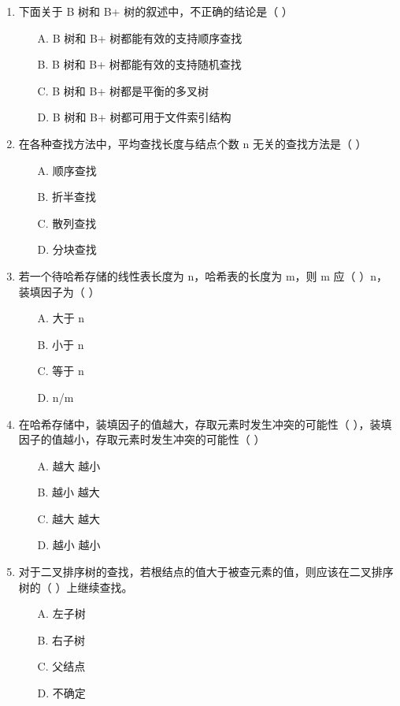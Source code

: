 \documentclass[12pt, a4paper]{article}
\begin{document}
\begin{enumerate}[label=\arabic*.]
	\item 下面关于 B 树和 B+ 树的叙述中，不正确的结论是（ ）
	      \begin{enumerate}
		      \item[A.] B 树和 B+ 树都能有效的支持顺序查找
		      \item[B.] B 树和 B+ 树都能有效的支持随机查找
		      \item[C.] B 树和 B+ 树都是平衡的多叉树
		      \item[D.] B 树和 B+ 树都可用于文件索引结构
	      \end{enumerate}

	\item 在各种查找方法中，平均查找长度与结点个数 n 无关的查找方法是（ ）
	      \begin{enumerate}
		      \item[A.] 顺序查找
		      \item[B.] 折半查找
		      \item[C.] 散列查找
		      \item[D.] 分块查找
	      \end{enumerate}

	\item 若一个待哈希存储的线性表长度为 n，哈希表的长度为 m，则 m 应（ ）n，装填因子为（ ）
	      \begin{enumerate}
		      \item[A.] 大于 n
		      \item[B.] 小于 n
		      \item[C.] 等于 n
		      \item[D.] n/m
	      \end{enumerate}

	\item 在哈希存储中，装填因子的值越大，存取元素时发生冲突的可能性（ ），装填因子的值越小，存取元素时发生冲突的可能性（ ）
	      \begin{enumerate}
		      \item[A.] 越大 越小
		      \item[B.] 越小 越大
		      \item[C.] 越大 越大
		      \item[D.] 越小 越小
	      \end{enumerate}

	\item 对于二叉排序树的查找，若根结点的值大于被查元素的值，则应该在二叉排序树的（ ）上继续查找。
	      \begin{enumerate}
		      \item[A.] 左子树
		      \item[B.] 右子树
		      \item[C.] 父结点
		      \item[D.] 不确定
	      \end{enumerate}


\end{enumerate}
\end{document}
